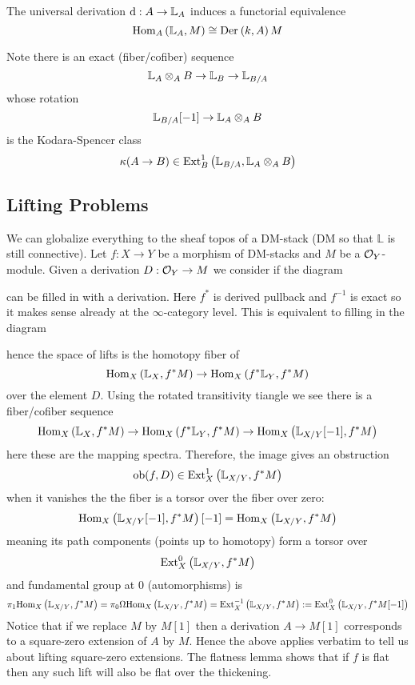 \documentclass[12pt]{article}
\newcommand{\LL}{\mathbb{L}}
\begin{document}
\begin{theorem}
The universal derivation $\d : A \to \LL_{A}$ induces a functorial equivalence
\[ \Hom{A}{\LL_A}{M} \cong \Der{k}{A}{M} \]
\end{theorem}

Note there is an exact (fiber/cofiber) sequence
\[ \LL_A \ot_A B \to \LL_B \to \LL_{B/A} \]
whose rotation
\[ \LL_{B/A}[-1] \to \LL_{A} \ot_A B \]
is the Kodara-Spencer class
\[ \kappa(A \to B) \in \Ext{1}{B}{\LL_{B/A}}{\LL_{A} \ot_A B} \]

\subsection{Lifting Problems}

We can globalize everything to the sheaf topos of a DM-stack (DM so that $\LL$ is still connective). Let $f : X \to Y$ be a morphism of DM-stacks and $M$ be a $\mathcal{O}_{Y}$-module. Given a derivation $D : \mathcal{O}_{Y} \to M$ we consider if the diagram
\begin{center}
\end{center}
can be filled in with a derivation.
Here $f^*$ is derived pullback and $f^{-1}$ is exact so it makes sense already at the $\infty$-category level. This is equivalent to filling in the diagram
\begin{center}
\end{center}
hence the space of lifts is the homotopy fiber of
\[ \Hom{X}{\LL_X}{f^* M} \to \Hom{X}{f^* \LL_Y}{f^* M} \]
over the element $D$. Using the rotated transitivity tiangle we see there is a fiber/cofiber sequence
\[ \Hom{X}{\LL_X}{f^* M} \to \Hom{X}{f^* \LL_Y}{f^* M} \to \Hom{X}{\LL_{X/Y}[-1]}{f^* M} \]
here these are the mapping spectra. Therefore, the image gives an obstruction
\[ \ob(f, D) \in \Ext{1}{X}{\LL_{X/Y}}{f^*M} \]
when it vanishes the the fiber is a torsor over the fiber over zero:
\[ \Hom{X}{\LL_{X/Y}[-1]}{f^* M}[-1] = \Hom{X}{\LL_{X/Y}}{f^* M} \]
meaning its path components (points up to homotopy) form a torsor over
\[ \Ext{0}{X}{\LL_{X/Y}}{f^* M} \]
and fundamental group at $0$ (automorphisms) is 
\[ \pi_1 \Hom{X}{\LL_{X/Y}}{f^* M} = \pi_0 \Omega \Hom{X}{\LL_{X/Y}}{f^* M} = \Ext{-1}{X}{\LL_{X/Y}}{f^* M} := \Ext{0}{X}{\LL_{X/Y}}{f^* M[-1]} \]
Notice that if we replace $M$ by $M[1]$ then a derivation $A \to M[1]$ corresponds to a square-zero extension of $A$ by $M$. Hence the above applies verbatim to tell us about lifting square-zero extensions. The flatness lemma shows that if $f$ is flat then any such lift will also be flat over the thickening.
\end{document}
